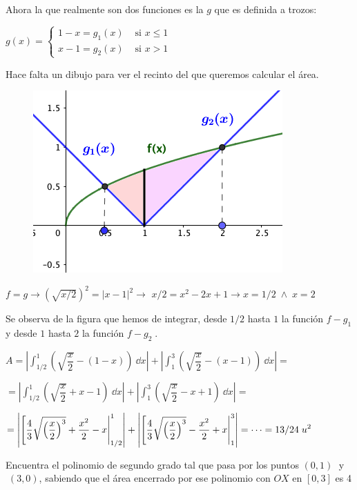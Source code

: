 \begin{proofw}\renewcommand{\qedsymbol}{$\diamond$}

Ahora la que realmente son dos funciones es la $g$ que es definida a trozos: 

$g(x)=\begin{cases}
1-x = g_1(x)& \text{ si } x\le 1 \\
x-1 = g_2(x)& \text{ si }  x>1	
\end{cases}\; $ 

Hace falta un dibujo para ver el recinto del que queremos calcular el área.

\begin{figure}[H]
 		\centering
		\includegraphics[width=.50
		\textwidth]{imagenes/imagenes08/T08IM19.png}
\end{figure}
$f=g\to (\sqrt{x/2})^2=|x-1|^2 \to $
$x/2=x^2-2x+1 \rightarrow x=1/2 \; \wedge \; x=2 $ 



Se observa de la figura que hemos de integrar, desde $1/2$ hasta $1$ la función $f-g_1$ y desde $1$ hasta $2$ la función $f-g_2\;$.


$A=\displaystyle \left| \int_{1/2}^{1} \left(\sqrt{\dfrac x 2}-(1-x)  \right) \: \dd x \right|+  \left| \int_{1}^{3} \left(\sqrt{\dfrac x 2}-(x-1)  \right) \: \dd x \right|=$

$\displaystyle =\left| \int_{1/2}^{1} \left(\sqrt{\dfrac x 2}+x-1  \right) \: \dd x \right|+  \left| \int_{1}^{3} \left(\sqrt{\dfrac x 2}-x+1  \right) \: \dd x \right|=$

$\displaystyle = \left| \eval[\dfrac 4 3 \sqrt{\left( \dfrac x 2 \right)^3}+\dfrac {x^2}{2}-x|_{1/2}^{1} \right| + \left| \eval[\dfrac 4 3 \sqrt{\left( \dfrac x 2 \right)^3}-\dfrac {x^2}{2}+x|_{1}^{3} \right|=\cdots = 13/24 \; u^2$
\end{proofw}

\begin{ejre}
Encuentra el polinomio de segundo grado tal que pasa por los puntos $(0,1)\;$ y $\;(3,0)$, sabiendo que el área encerrado por ese polinomio con $OX$ en $[0,3]$ es 4	
\end{ejre}

